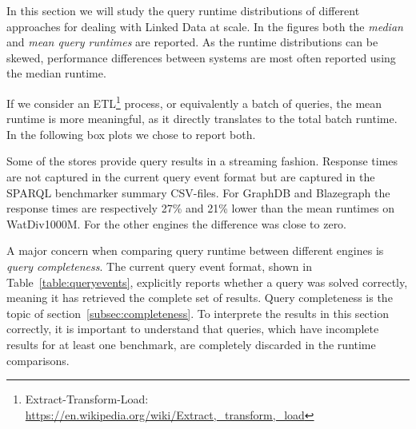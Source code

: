 
In this section we will study the query runtime distributions of different approaches for dealing with Linked Data at scale. In the figures both the \emph{median} and \emph{mean query runtimes} are reported. As the runtime distributions can be skewed, performance differences between systems are most often reported using the median runtime. 

If we consider an ETL\footnote{\scriptsize Extract-Transform-Load:  \url{https://en.wikipedia.org/wiki/Extract,_transform,_load}} process, or equivalently a batch of queries, the mean runtime is more meaningful, as it directly translates to the total batch runtime. In the following box plots we chose to report both.

Some of the stores provide query results in a streaming fashion. Response times are not captured in the current query event format but are captured in the SPARQL benchmarker summary CSV-files. For GraphDB and Blazegraph the response times are respectively 27\% and 21\% lower than the mean runtimes on WatDiv1000M. For the other engines the difference was close to zero.

A major concern when comparing query runtime between different engines is \emph{query completeness}. The current query event format, shown in Table~\ref{table:queryevents}, explicitly reports whether a query was solved correctly, meaning it has retrieved the complete set of results. Query completeness is the topic of section~\ref{subsec:completeness}. To interprete the results in this section correctly, it is important to understand that queries, which have incomplete results for at least one benchmark, are completely discarded in the runtime comparisons.

